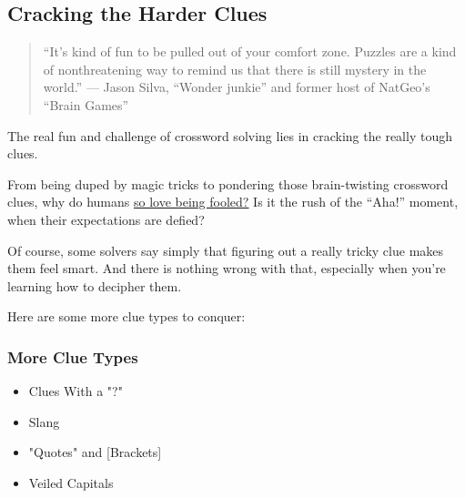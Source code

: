 \hypertarget{cracking-the-harder-clues}{%
\subsection{Cracking the Harder Clues}\label{cracking-the-harder-clues}}

\begin{quote}
``It's kind of fun to be pulled out of your comfort zone. Puzzles are a
kind of nonthreatening way to remind us that there is still mystery in
the world.'' --- Jason Silva, ``Wonder junkie'' and former host of
NatGeo's ``Brain Games''
\end{quote}

The real fun and challenge of crossword solving lies in cracking the
really tough clues.

From being duped by magic tricks to pondering those brain-twisting
crossword clues, why do humans
\href{https://wordplay.blogs.nytimes.com/2013/09/12/fool-for-being-fooled/}{so
love being fooled?} Is it the rush of the ``Aha!'' moment, when their
expectations are defied?

Of course, some solvers say simply that figuring out a really tricky
clue makes them feel smart. And there is nothing wrong with that,
especially when you're learning how to decipher them.~

Here are some more clue types to conquer:~

\hypertarget{more-clue-types}{%
\subsubsection{More Clue Types}\label{more-clue-types}}

\begin{itemize}
\tightlist
\item
  Clues With a "?"
\item
  Slang
\item
  "Quotes" and {[}Brackets{]}
\item
  Veiled Capitals
\end{itemize}

